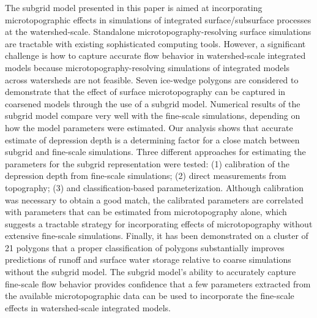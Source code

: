 The subgrid model presented in this paper is aimed at incorporating microtopographic effects in simulations of integrated surface/subsurface processes at the watershed-scale.
Standalone microtopography-resolving surface simulations are tractable with existing sophisticated computing tools.
However, a significant challenge is how to capture accurate flow behavior in watershed-scale integrated models because microtopography-resolving simulations of integrated models across watersheds are not feasible.
Seven ice-wedge polygons are considered to demonstrate that the effect of surface microtopography can be captured in coarsened models through the use of a subgrid model.
Numerical results of the subgrid model compare very well with the fine-scale simulations, depending on how the model parameters were estimated.
Our analysis shows that accurate estimate of depression depth is a determining factor for a close match between subgrid and fine-scale simulations.
Three different approaches for estimating the parameters for the subgrid representation were tested: (1) calibration of the depression depth from fine-scale simulations; (2) direct measurements from topography; (3) and classification-based parameterization.
Although calibration was necessary to obtain a good match, the calibrated parameters are correlated with parameters that can be estimated from microtopography alone, which suggests a tractable strategy for incorporating effects of microtopography without extensive fine-scale simulations. 
Finally, it has been demonstrated on a cluster of 21 polygons that a proper classification of polygons substantially improves predictions of runoff and surface water storage relative to coarse simulations without the subgrid model.
The subgrid model's ability to accurately capture fine-scale flow behavior provides confidence that a few parameters extracted from the available microtopographic data can be used to incorporate the fine-scale effects in watershed-scale integrated models.

